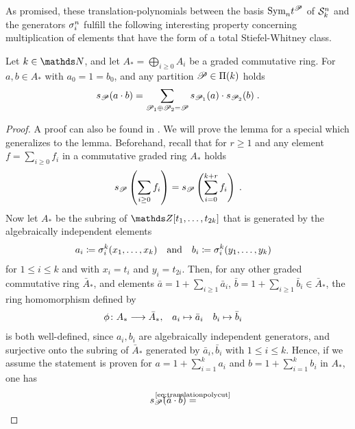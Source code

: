 As promised, these translation-polynomials between the basis
$\text{\normalfont Sym}_{n}t^{\mathscr{P}}$ of $\mathcal{S}^{n}_k$ and the generators $\sigma_{i}^{n}$
fulfill the following interesting property concerning
multiplication of elements that have the form of a total
Stiefel-Whitney class.
\begin{Lem}\label{lem:productrule:general}
  Let $k\in\Nat$, and let $A_*=\bigoplus_{i\geq 0} A_i$ be a graded
  commutative ring.
  For $a,b\in A_*$ with $a_0=1=b_0$, and any partition
  $\mathscr{P}\in\Pi({k})$ holds
  \begin{gather*}
    s_{\mathscr{P}}(a\cdot b)
    = \sum_{\mathscr{P}_1\oplus\mathscr{P}_2=\mathscr{P}}
    s_{\mathscr{P}_1}(a) \cdot s_{\mathscr{P}_2}(b)
    \;.
  \end{gather*}
  \begin{proof}
    A proof can also be found in
    \cite[Theorem~33, p.~91f]{milnorlectures}.
    We will prove the lemma for a special which generalizes to
    the lemma.
    Beforehand, recall that for $r\geq 1$ and any
    element $f=\sum_{i\geq 0}f_i$ in a commutative graded ring $A_*$
    holds
    \begin{gather}\label{eq:translationpolycut}
      s_{\mathscr{P}}\left( \sum_{i\geq 0}f_i \right)
      = s_{\mathscr{P}}\left( \sum_{i=0}^{k+r}f_i \right)
      \;.
    \end{gather}
    Now let $A_*$ be the subring of $\Z[t_1,\dotsc,t_{2k}]$ that is
    generated by the algebraically independent elements
    \begin{align*}
      a_i&\coloneqq \sigma_{i}^{k}(x_1,\dotsc,x_k)
      &\text{and}&
      &b_i&\coloneqq \sigma_{i}^{k}(y_1,\dotsc,y_k)
    \end{align*}
    for $1\leq i\leq k$ and with $x_i=t_i$ and $y_i=t_{2i}$.
    Then, for any other graded commutative
    ring $\bar A_*$, and elements
    $\bar a=1+\sum_{i\geq 1}\bar a_i$,
    $\bar b=1+\sum_{i\geq 1}\bar b_i\in\bar A_*$, the ring
    homomorphism defined by
    \begin{align*}
      \phi\colon A_*&\longrightarrow \bar A_*,
      &a_i&\mapsto \bar a_i
      &b_i&\mapsto \bar b_i
    \end{align*}
    is both well-defined, since $a_i,b_i$ are algebraically independent
    generators, and surjective onto the subring of $\bar A_*$
    generated by $\bar a_i,\bar b_i$ with $1\leq i\leq k$.
    Hence, if we assume the statement is proven for
    $a=1+\sum_{i=1}^k a_i$ and $b=1+\sum_{i=1}^k b_i$ in $A_*$, one
    has
    \begin{align*}
      \s{\Part}(\bar a\cdot \bar b)
      &\cequalsby{\eqref{eq:translationpolycut}}

\end{align*}
\end{proof}
\end{Lem}
